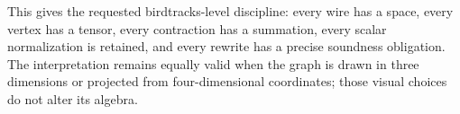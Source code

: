 This gives the requested birdtracks-level discipline: every wire has a space, every vertex has a tensor, every contraction has a summation, every scalar normalization is retained, and every rewrite has a precise soundness obligation. The interpretation remains equally valid when the graph is drawn in three dimensions or projected from four-dimensional coordinates; those visual choices do not alter its algebra.
